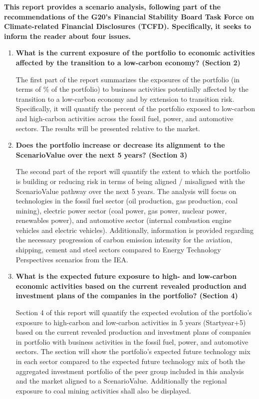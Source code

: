 \documentclass[10pt,table,a4]{article}\usepackage[]{graphicx}\usepackage[]{color}
\begin{document}
	\begin{multicols}{2}
		
		\textbf{This report provides a scenario analysis, following part of the recommendations of the G20's Financial Stability Board Task Force on Climate-related Financial Disclosures (TCFD). Specifically, it seeks to inform the reader about four issues.}
		
		\begin{enumerate}
			\item{\textbf{What is the current exposure of the portfolio to economic activities affected by the transition to a low-carbon economy? (Section 2) }
			}
			
			The first part of the report summarizes the exposures of the portfolio (in terms of \% of the portfolio) to business activities potentially affected by the transition to a low-carbon economy and by extension to transition risk. Specifically, it will quantify the percent of the portfolio exposed to low-carbon and high-carbon activities across the fossil fuel, power, and automotive sectors. The results will be presented relative to the market.
			
			\item{\textbf{Does the portfolio increase or decrease its alignment to the ScenarioValue over the next 5 years? (Section 3)}
			}
			
			The second part of the report will quantify the extent to which the portfolio is building or reducing risk in terms of being aligned / misaligned with the ScenarioValue pathway over the next 5 years. The analysis will focus on technologies in the fossil fuel sector (oil production, gas production, coal mining), electric power sector (coal power, gas power, nuclear power, renewables power), and automotive sector (internal combustion engine vehicles and electric vehicles). Additionally, information is provided regarding the necessary progression of carbon emission intensity for the aviation, shipping, cement and steel sectors compared to Energy Technology Perspectives scenarios from the IEA. 
			
			\item{\textbf{What is the expected future exposure to high- and low-carbon economic activities based on the current revealed production and investment plans of the companies in the portfolio? (Section 4)}
			}
			
			Section 4 of this report will quantify the expected evolution of the portfolio's exposure to high-carbon and low-carbon activities in 5 years (Startyear+5) based on the current revealed production and investment plans of companies in portfolio with business activities in the fossil fuel, power, and automotive sectors. The section will show the portfolio's expected future technology mix in each sector compared to the expected future technology mix of both the aggregated investment portfolio of the peer group included in this analysis and the market aligned to a ScenarioValue. Additionally the regional exposure to coal mining activities shall also be displayed. 
			

\end{enumerate}
\end{multicols}
\end{document}
